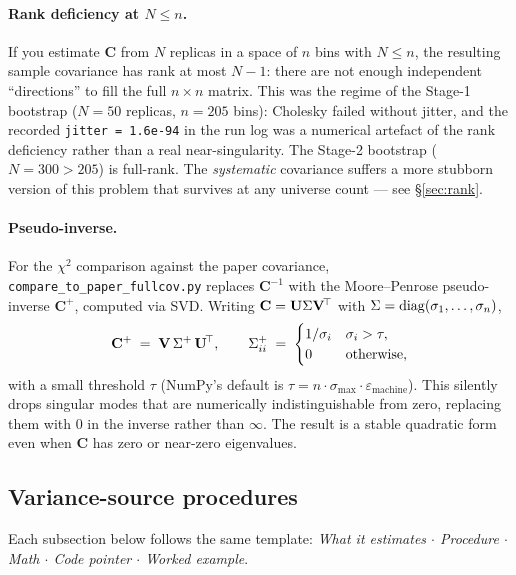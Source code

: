 \paragraph{Rank deficiency at $N \le n$.}
If you estimate $\mathbf{C}$ from $N$ replicas in a space of $n$ bins
with $N\le n$, the resulting sample covariance has rank at most
$N-1$: there are not enough independent ``directions'' to fill the
full $n\times n$ matrix. This was the regime of the Stage-1 bootstrap
($N=50$ replicas, $n=205$ bins): Cholesky failed without jitter, and
the recorded \texttt{jitter = 1.6e-94} in the run log was a numerical
artefact of the rank deficiency rather than a real near-singularity.
The Stage-2 bootstrap ($N=300 > 205$) is full-rank. The
\emph{systematic} covariance suffers a more stubborn version of this
problem that survives at any universe count --- see \S\ref{sec:rank}.

\paragraph{Pseudo-inverse.}
For the $\chi^{2}$ comparison against the paper covariance,
\texttt{compare\_to\_paper\_fullcov.py} replaces $\mathbf{C}^{-1}$
with the Moore--Penrose pseudo-inverse $\mathbf{C}^{+}$, computed
via SVD. Writing $\mathbf{C}=\mathbf{U}\Sigma\mathbf{V}^{\!\top}$ with
$\Sigma=\mathrm{diag}(\sigma_{1},\dots,\sigma_{n})$,
\begin{equation}
\mathbf{C}^{+} \;=\; \mathbf{V}\,\Sigma^{+}\,\mathbf{U}^{\!\top},
\qquad
\Sigma^{+}_{ii} \;=\;
\begin{cases}
1/\sigma_{i} & \sigma_{i} > \tau,\\
0 & \text{otherwise},
\end{cases}
\end{equation}
with a small threshold $\tau$ (NumPy's default is
$\tau = n \cdot \sigma_{\max} \cdot \varepsilon_{\text{machine}}$).
This silently drops singular modes that are numerically
indistinguishable from zero, replacing them with $0$ in the inverse
rather than $\infty$. The result is a stable quadratic form even when
$\mathbf{C}$ has zero or near-zero eigenvalues.

\subsection{Variance-source procedures}
\label{sec:variance}

Each subsection below follows the same template:
\emph{What it estimates $\cdot$ Procedure $\cdot$ Math $\cdot$ Code
pointer $\cdot$ Worked example}.

